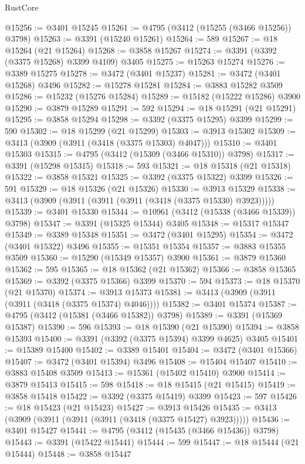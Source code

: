 \begin{lexlean}{RustCore}
\begin{coremodule}
@15256 := @3401 @15245
@15261 := @4795 (@3412 (@15255 (@3466 @15256)) @3798)
@15263 := @3391 (@15240 @15261)
@15264 := 589
@15267 := @18 @15264 (@21 @15264)
@15268 := @3858 @15267
@15274 := @3391 (@3392 (@3375 @15268) @3399 @4109) @3405
@15275 := @15263 @15274
@15276 := @3389 @15275
@15278 := @3472 (@3401 @15237)
@15281 := @3472 (@3401 @15268) @3496
@15282 := @15278 @15281
@15284 := @3883 @15282 @3509
@15286 := @15232 (@15276 @15284)
@15289 := @15182 (@15222 @15286) @3900
@15290 := @3879 @15289
@15291 := 592
@15294 := @18 @15291 (@21 @15291)
@15295 := @3858 @15294
@15298 := @3392 (@3375 @15295) @3399
@15299 := 590
@15302 := @18 @15299 (@21 @15299)
@15303 := @3913 @15302
@15309 := @3413 (@3909 (@3911 (@3418 (@3375 @15303) @4047)))
@15310 := @3401 @15303
@15315 := @4795 (@3412 (@15309 (@3466 @15310)) @3798)
@15317 := @3391 (@15298 @15315)
@15318 := 593
@15321 := @18 @15318 (@21 @15318)
@15322 := @3858 @15321
@15325 := @3392 (@3375 @15322) @3399
@15326 := 591
@15329 := @18 @15326 (@21 @15326)
@15330 := @3913 @15329
@15338 := @3413 (@3909 (@3911 (@3911 (@3911 (@3418 (@3375 @15330) @3923)))))
@15339 := @3401 @15330
@15344 := @10961 (@3412 (@15338 (@3466 @15339)) @3798)
@15347 := @3391 (@15325 @15344) @3405
@15348 := @15317 @15347
@15349 := @3389 @15348
@15351 := @3472 (@3401 @15295)
@15354 := @3472 (@3401 @15322) @3496
@15355 := @15351 @15354
@15357 := @3883 @15355 @3509
@15360 := @15290 (@15349 @15357) @3900
@15361 := @3879 @15360
@15362 := 595
@15365 := @18 @15362 (@21 @15362)
@15366 := @3858 @15365
@15369 := @3392 (@3375 @15366) @3399
@15370 := 594
@15373 := @18 @15370 (@21 @15370)
@15374 := @3913 @15373
@15381 := @3413 (@3909 (@3911 (@3911 (@3418 (@3375 @15374) @4046))))
@15382 := @3401 @15374
@15387 := @4795 (@3412 (@15381 (@3466 @15382)) @3798)
@15389 := @3391 (@15369 @15387)
@15390 := 596
@15393 := @18 @15390 (@21 @15390)
@15394 := @3858 @15393
@15400 := @3391 (@3392 (@3375 @15394) @3399 @4625) @3405
@15401 := @15389 @15400
@15402 := @3389 @15401
@15404 := @3472 (@3401 @15366)
@15407 := @3472 (@3401 @15394) @3496
@15408 := @15404 @15407
@15410 := @3883 @15408 @3509
@15413 := @15361 (@15402 @15410) @3900
@15414 := @3879 @15413
@15415 := 598
@15418 := @18 @15415 (@21 @15415)
@15419 := @3858 @15418
@15422 := @3392 (@3375 @15419) @3399
@15423 := 597
@15426 := @18 @15423 (@21 @15423)
@15427 := @3913 @15426
@15435 := @3413 (@3909 (@3911 (@3911 (@3911 (@3418 (@3375 @15427) @3923)))))
@15436 := @3401 @15427
@15441 := @4795 (@3412 (@15435 (@3466 @15436)) @3798)
@15443 := @3391 (@15422 @15441)
@15444 := 599
@15447 := @18 @15444 (@21 @15444)
@15448 := @3858 @15447

\end{coremodule}
\end{lexlean}

